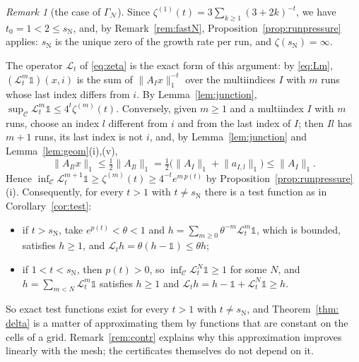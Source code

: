 \documentclass[11pt]{amsart}
\theoremstyle{definition}
\theoremstyle{remark}
\newtheorem{remark}[proposition]{Remark}
\newcommand{\cL}{\mathcal L}
\newcommand{\GN}{\Gamma_{\mathcal N}}
\newcommand{\sN}{s_{\mathrm N}}
\newcommand{\norm}[1]{\lVert #1\rVert}
\begin{document}
\begin{remark}[the case of $\GN$]\label{rem:GNfast}
Since $\zeta^{(1)}(t)=3\sum_{k\ge1}(3+2k)^{-t}$, we have $t_0=1<2\le\sN$, and, by Remark~\ref{rem:fastN},
Proposition~\ref{prop:runpressure} applies: $\sN$ is the unique zero of the growth
rate per run, and $\zeta(\sN)=\infty$.

The operator $\cL_t$ of \eqref{eq:zeta} is the exact form of this argument:
by \eqref{eq:Lm}, $(\cL_t^m\mathds 1)(x,i)$ is the sum of $\norm{A_Ix}_1^{-t}$ over the multiindices $I$
with $m$ runs whose last index differs from $i$. By Lemma~\ref{lem:junction},
$\sup_{\mathcal C}\cL_t^m\mathds 1\le4^t\zeta^{(m)}(t)$. Conversely, given $m\ge1$ and a multiindex
$I$ with $m$ runs, choose an index $l$ different from $i$ and from the last index
of $I$; then $Il$ has $m+1$ runs, its last index is not $i$, and, by Lemma~\ref{lem:junction} and Lemma~\ref{lem:geom}(i),(v),
\[
  \norm{A_{Il}x}_1\le\tfrac12\norm{A_{Il}}_1=\tfrac12\bigl(\norm{A_I}_1+\norm{a_{I,l}}_1\bigr)\le\norm{A_I}_1 .
\]
Hence
$\inf_{\mathcal C}\cL_t^{m+1}\mathds 1\ge\zeta^{(m)}(t)\ge4^{-t}e^{m\,p(t)}$ by
Proposition~\ref{prop:runpressure}(i). Consequently, for every $t>1$ with
$t\neq\sN$ there is a test function as in Corollary~\ref{cor:test}:
\begin{itemize}
\item if $t>\sN$, take $e^{p(t)}<\theta<1$ and $h=\sum_{m\ge0}\theta^{-m}\cL_t^m\mathds 1$,
  which is bounded, satisfies $h\ge1$, and $\cL_th=\theta(h-\mathds 1)\le\theta h$;
\item if $1<t<\sN$, then $p(t)>0$, so $\inf_{\mathcal C}\cL_t^N\mathds 1\ge1$ for some
  $N$, and $h=\sum_{m<N}\cL_t^m\mathds 1$ satisfies $h\ge1$ and
  $\cL_th=h-\mathds 1+\cL_t^N\mathds 1\ge h$.
\end{itemize}
So exact test functions exist for every $t>1$ with $t\neq\sN$, and Theorem~\ref{thm: delta} is a matter of approximating them by functions that are constant on the cells of a grid. Remark~\ref{rem:contr} explains why this approximation improves linearly with the mesh; the certificates themselves do not depend on it.
\end{remark}
\end{document}
